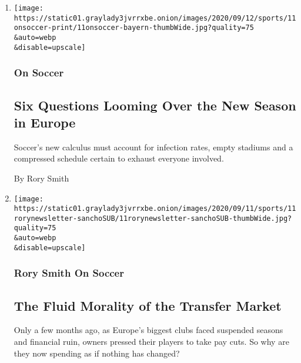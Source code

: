 \begin{enumerate}
\def\labelenumi{\arabic{enumi}.}
\item
  \href{/2020/09/11/sports/soccer/premier-league-preview.html}{}

  \texttt{[image: https://static01.graylady3jvrrxbe.onion/images/2020/09/12/sports/11onsoccer-print/11onsoccer-bayern-thumbWide.jpg?quality=75\\\&auto=webp\\\&disable=upscale]}

  \hypertarget{on-soccer}{%
  \subsubsection{On Soccer}\label{on-soccer}}

  \hypertarget{six-questions-looming-over-the-new-season-in-europe}{%
  \subsection{Six Questions Looming Over the New Season in
  Europe}\label{six-questions-looming-over-the-new-season-in-europe}}

  Soccer's new calculus must account for infection rates, empty stadiums
  and a compressed schedule certain to exhaust everyone involved.

  By Rory Smith
\item
  \href{/2020/09/11/sports/soccer/premier-league-transfer-window.html}{}

  \texttt{[image: https://static01.graylady3jvrrxbe.onion/images/2020/09/11/sports/11rorynewsletter-sanchoSUB/11rorynewsletter-sanchoSUB-thumbWide.jpg?quality=75\\\&auto=webp\\\&disable=upscale]}

  \hypertarget{rory-smith-on-soccer}{%
  \subsubsection{Rory Smith On Soccer}\label{rory-smith-on-soccer}}

  \hypertarget{the-fluid-morality-of-the-transfer-market}{%
  \subsection{The Fluid Morality of the Transfer
  Market}\label{the-fluid-morality-of-the-transfer-market}}

  Only a few months ago, as Europe's biggest clubs faced suspended
  seasons and financial ruin, owners pressed their players to take pay
  cuts. So why are they now spending as if nothing has changed?


\end{enumerate}

